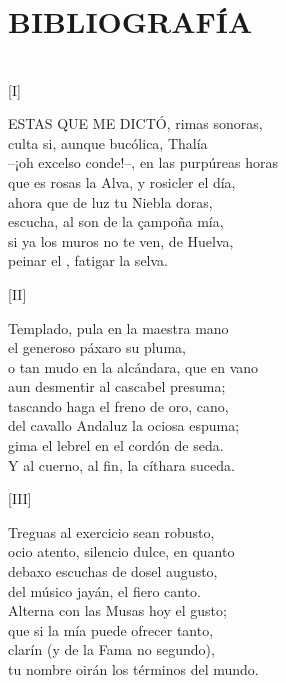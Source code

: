 \documentclass[11pt,a4paper,twoside]{article}
\begin{document}
\section*{\fontsize{11}{14}\selectfont BIBLIOGRAFÍA}
\nocite{*}
\printbibliography[heading=none]
\newpage

\section*{\centering \fontsize{11}{14}\selectfont[DEDICATORIA]}
\vspace{-1em}
%
\begin{center}
	[I]
\end{center}
\beginnumbering
\pstart
{\fontsize{9}{11}\selectfont ESTAS QUE ME DICTÓ}, rimas sonoras,\\
culta si, aunque bucólica, Thalía\\
--¡oh excelso conde!--, en las purpúreas horas\\
que es rosas la Alva, y rosicler el día,\\
ahora que de luz tu Niebla doras,\\
escucha, al son de la çampoña mía,\\
si ya los muros no te ven, de Huelva,\\
peinar el , fatigar la selva.\par\pend
%
\begin{center}
	[II]
\end{center}
\pstart
Templado, pula en la maestra mano\\
el generoso páxaro su pluma,\\
o tan mudo en la alcándara, que en vano\\
aun desmentir al cascabel presuma;\\
tascando haga el freno de oro, cano,\\
del cavallo Andaluz la ociosa espuma;\\
gima el lebrel en el cordón de seda.\\
Y al cuerno, al fin, la cíthara suceda.\par\pend
%
\begin{center}
	[III]
\end{center}
\pstart
Treguas al exercicio sean robusto,\\
ocio atento, silencio dulce, en quanto\\
debaxo escuchas de dosel augusto,\\
del músico jayán, el fiero canto.\\
Alterna con las Musas hoy el gusto;\\
que si la mía puede ofrecer tanto,\\
clarín (y de la Fama no segundo),\\
tu nombre oirán los términos del mundo.\par\pend
%
\end{document}
